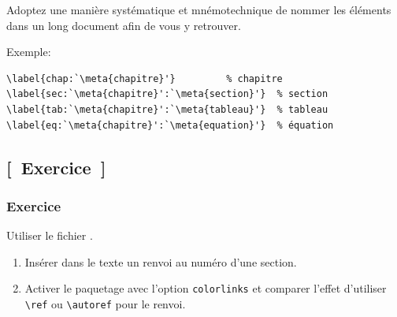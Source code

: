 \begin{frame}[plain,fragile=singleslide]
  \begin{conseil}
    Adoptez une manière systématique et mnémotechnique de nommer les
    éléments dans un long document afin de vous y retrouver.

    \bigskip %
    Exemple:
\begin{lstlisting}
\label{chap:`\meta{chapitre}'}         % chapitre
\label{sec:`\meta{chapitre}':`\meta{section}'}  % section
\label{tab:`\meta{chapitre}':`\meta{tableau}'}  % tableau
\label{eq:`\meta{chapitre}':`\meta{equation}'}  % équation
\end{lstlisting}
  \end{conseil}
\end{frame}

\subsection{[~Exercice~]}

\begin{frame}
  \frametitle{Exercice}

  Utiliser le fichier .
  \begin{enumerate}
  \item Insérer dans le texte un renvoi au numéro d'une section.
  \item Activer le paquetage  avec l'option
    \texttt{colorlinks} et comparer l'effet d'utiliser
    \texttt{{\textbackslash}ref} ou \texttt{{\textbackslash}autoref}
    pour le renvoi.
  \end{enumerate}
\end{frame}

